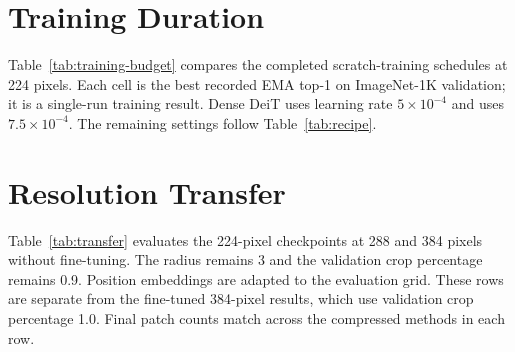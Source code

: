 \begin{table}[h]
\caption{ImageNet top-1 (\%) at matched final patch counts.
$\Delta$ is ToMe minus \mn{} in percentage points.}
\label{tab:sweepdetail}
\centering\small

\end{table}


\section{Training Duration}
\label{app:training-budget}

Table~\ref{tab:training-budget} compares the completed scratch-training
schedules at 224 pixels. Each cell is the best recorded EMA top-1 on
ImageNet-1K validation; it is a single-run training result.
Dense DeiT uses learning rate $5\times10^{-4}$ and \mn{} uses
$7.5\times10^{-4}$. The remaining settings follow Table~\ref{tab:recipe}.

\begin{table}[htbp]
\caption{Best EMA ImageNet-1K top-1 (\%) under two scratch-training schedules.
$\Delta$ is the 300-epoch minus 150-epoch result in percentage points.}
\label{tab:training-budget}
\centering\small

\end{table}

\section{Resolution Transfer}
\label{app:transfer}

Table~\ref{tab:transfer} evaluates the 224-pixel checkpoints at 288 and
384 pixels without fine-tuning. The \mn{} radius remains 3 and the
validation crop percentage remains 0.9. Position embeddings are adapted
to the evaluation grid. These rows are separate from the fine-tuned
384-pixel results, which use validation crop percentage 1.0.
Final patch counts match across the compressed methods in each row.

\begin{table}[htbp]
\caption{ImageNet-1K top-1 (\%) after changing input resolution without
fine-tuning the 224-pixel checkpoints. Patch counts exclude CLS.}
\label{tab:transfer}
\centering\small

\end{table}
